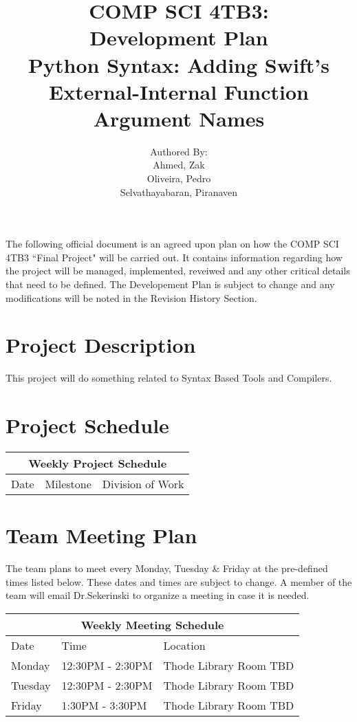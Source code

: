 \documentclass{article}
\title{COMP SCI 4TB3:\\ Development Plan\\ Python Syntax:  Adding Swift's External-Internal Function Argument Names}
\author{ Authored By:
		\\ Ahmed, Zak
		\\ Oliveira, Pedro
		\\ Selvathayabaran, Piranaven
}
\date{}
\begin{document}
\newpage

\maketitle

The following official document is an agreed upon plan on how the COMP SCI 4TB3 ``Final Project" will be carried out. It contains information regarding how the project will be managed, implemented, reveiwed and any other critical details that need to be defined. The Developement Plan is subject to change and any modifications will be noted in the Revision History Section. 

\tableofcontents 

\section {Project Description}
This project will do something related to Syntax Based Tools and Compilers.
 
 \section{Project Schedule}

\begin{tabular}{ |p{3cm}||p{3cm}|p{3cm}|  }
 \hline
 \multicolumn{3}{|c|}{Weekly Project Schedule} \\
 \hline
 Date & Milestone  & Division of Work \\
 \hline


 \hline
\end{tabular}
 
\section{Team Meeting Plan}
The team plans to meet every Monday, Tuesday \& Friday at the pre-defined times listed below. These dates and times are subject to change. A member of the team will email Dr.Sekerinski to organize a meeting in case it is needed.\newline 

\begin{tabular}{ |p{3cm}||p{3cm}|p{3cm}|  }
 \hline
 \multicolumn{3}{|c|}{Weekly Meeting Schedule} \\
 \hline
 Date &Time  & Location\\
 \hline
 Monday &   12:30PM - 2:30PM   & Thode Library Room TBD  \\
 Tuesday &   12:30PM - 2:30PM   & Thode Library Room TBD  \\
 Friday  & 1:30PM - 3:30PM & Thode Library Room TBD  \\

 \hline
\end{tabular}
\end{document}
